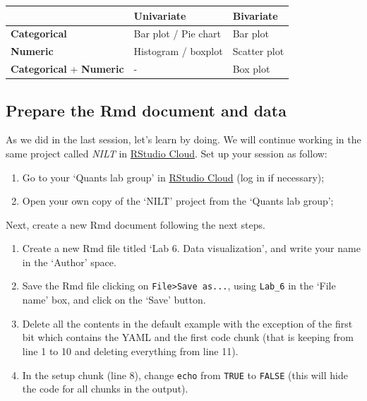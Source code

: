 \documentclass[
]{book}
\providecommand{\tightlist}{%
  \setlength{\itemsep}{0pt}\setlength{\parskip}{0pt}}
\begin{document}
\begin{longtable}[]{@{}lll@{}}
\toprule\noalign{}
& \textbf{Univariate} & \textbf{Bivariate} \\
\midrule\noalign{}
\endhead
\bottomrule\noalign{}
\endlastfoot
\textbf{Categorical} & Bar plot / Pie chart & Bar plot \\
\textbf{Numeric} & Histogram / boxplot & Scatter plot \\
\textbf{Categorical} + \textbf{Numeric} & - & Box plot \\
\end{longtable}

\hypertarget{prepare-the-rmd-document-and-data}{%
\subsection{Prepare the Rmd document and data}\label{prepare-the-rmd-document-and-data}}

As we did in the last session, let's learn by doing. We will continue working in the same project called \emph{NILT} in \href{https://rstudio.cloud/}{RStudio Cloud}. Set up your session as follow:

\begin{enumerate}
\def\labelenumi{\arabic{enumi}.}
\tightlist
\item
  Go to your `Quants lab group' in \href{https://rstudio.cloud/}{RStudio Cloud} (log in if necessary);
\item
  Open your own copy of the `NILT' project from the `Quants lab group';
\end{enumerate}

Next, create a new Rmd document following the next steps.

\begin{enumerate}
\def\labelenumi{\arabic{enumi}.}
\tightlist
\item
  Create a new Rmd file titled `Lab 6. Data visualization', and write your name in the `Author' space.
\item
  Save the Rmd file clicking on \texttt{File\textgreater{}Save\ as...}, using \texttt{Lab\_6} in the `File name' box, and click on the `Save' button.
\item
  Delete all the contents in the default example with the exception of the first bit which contains the YAML and the first code chunk (that is keeping from line 1 to 10 and deleting everything from line 11).
\item
  In the setup chunk (line 8), change \texttt{echo} from \texttt{TRUE} to \texttt{FALSE} (this will hide the code for all chunks in the output).
\end{enumerate}
\end{document}
